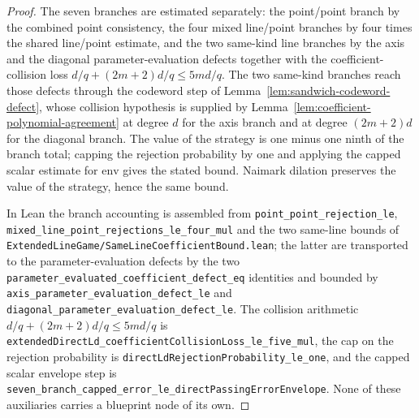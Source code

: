 \begin{proof}
	\leanok
	The seven branches are estimated separately: the point/point branch by the
	combined point consistency, the four mixed line/point branches by four
	times the shared line/point estimate, and the two same-kind line branches
	by the axis and the diagonal parameter-evaluation defects together with
	the coefficient-collision loss $d/q + (2m+2)d/q \le 5md/q$. The two
	same-kind branches reach those defects through the codeword step of
	Lemma~\ref{lem:sandwich-codeword-defect}, whose collision hypothesis is
	supplied by Lemma~\ref{lem:coefficient-polynomial-agreement} at degree $d$
	for the axis branch and at degree $(2m+2)d$ for the diagonal branch. The
	value of the strategy is one minus one ninth of the branch total; capping
	the rejection probability by one and applying the capped scalar estimate
	for $\mathrm{env}$ gives the stated bound. Naimark dilation preserves the
	value of the strategy, hence the same bound.

	In Lean the branch accounting is assembled from
	\texttt{point\_point\_rejection\_le},
	\texttt{mixed\_line\_point\_rejections\_le\_four\_mul} and the two
	same-line bounds of
	\texttt{ExtendedLineGame/SameLineCoefficientBound.lean}; the latter are
	transported to the parameter-evaluation defects by the two
	\texttt{parameter\_evaluated\_coefficient\_defect\_eq} identities and
	bounded by \texttt{axis\_parameter\_evaluation\_defect\_le} and
	\texttt{diagonal\_parameter\_evaluation\_defect\_le}. The collision
	arithmetic $d/q + (2m+2)d/q \le 5md/q$ is
	\texttt{extendedDirectLd\_coefficientCollisionLoss\_le\_five\_mul}, the
	cap on the rejection probability is
	\texttt{directLdRejectionProbability\_le\_one}, and the capped scalar
	envelope step is
	\texttt{seven\_branch\_capped\_error\_le\_directPassingErrorEnvelope}.
	None of these auxiliaries carries a blueprint node of its own.
\end{proof}

